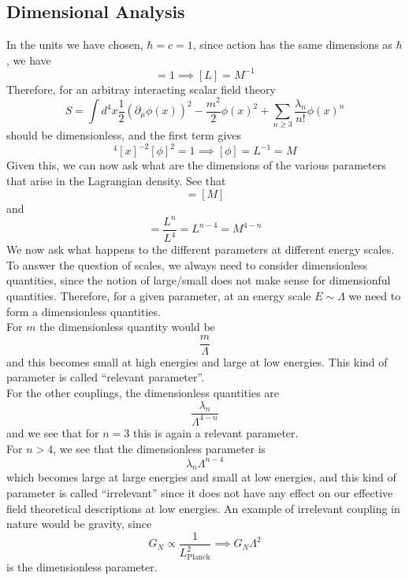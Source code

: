 \documentclass[11pt]{article}
\newcommand{\del}{\partial}
\numberwithin{equation}{section}
\begin{document}
\subsection{Dimensional Analysis}
\label{sec:dimensionalanalysis}
In the units we have chosen, \(\hbar = c = 1\), since action has the same dimensions as \(\hbar\), we have 
\begin{equation*}
    [S] = 1 \implies [L] = M^{-1}
\end{equation*}
Therefore, for an arbitray interacting scalar field theory 
\begin{equation*}
    S = \int d^4x \frac{1}{2}(\del_\mu \phi(x))^2 - \frac{m^2}{2}\phi(x)^2 + \sum_{n\ge 3}\frac{\lambda_n}{n!}\phi(x)^n
\end{equation*}
should be dimensionless, and the first term gives
\begin{equation*}
    [x]^4[x]^{-2}[\phi]^2 = 1 \implies [\phi]= L^{-1} = M
\end{equation*}
Given this, we can now ask what are the dimensions of the various parameters that arise in the Lagrangian density. See that 
\begin{equation*}
    [m] = [M]
\end{equation*}
and
\begin{equation*}
    [\lambda_n] = \frac{L^n}{L^4} = L^{n-4} = M^{4-n}
\end{equation*}
We now ask what happens to the different parameters at different energy scales. To answer the question of scales, we always need to consider dimensionless quantities, since the notion of large/small does not make sense for dimensionful quantities. Therefore, for a given parameter, at an energy scale \(E\sim \Lambda\) we need to form a dimensionless quantities. \\

For \(m\) the dimensionless quantity would be 
\begin{equation*}
    \frac{m}{\Lambda}
\end{equation*}
and this becomes small at high energies and large at low energies. This kind of parameter is called ``relevant parameter''. \\
For the other couplings, the dimensionless quantities are 
\begin{equation*}
    \frac{\lambda_n}{\Lambda^{4-n}}
\end{equation*}
and we see that for \(n=3\) this is again a relevant parameter. \\
For \(n>4\), we see that the dimensionless parameter is 
\begin{equation*}
    \lambda_n \Lambda^{n-4}
\end{equation*}
which becomes large at large energies and small at low energies, and this kind of parameter is called ``irrelevant'' since it does not have any effect on our effective field theoretical descriptions at low energies. An example of irrelevant coupling in nature would be gravity, since 
\begin{equation*}
    G_N \propto \frac{1}{L_{\text{Planck}}^2} \implies G_N\Lambda^2
\end{equation*} is the dimensionless parameter. \\
\end{document}
